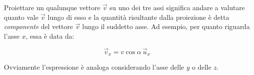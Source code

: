 Proiettare un qualunque vettore $\vec{v}$ su uno dei tre assi significa andare a valutare quanto vale $\vec{v}$ lungo di esso e la quantità risultante dalla proiezione è detta \emph{componente} del vettore $\vec{v}$ lungo il suddetto asse. Ad esempio, per quanto riguarda l'asse $x$, essa è data da:

\[
	\vec{v}_x=v\cos\alpha\, \vec{u}_x
\]

Ovviamente l'espressione è analoga considerando l'asse delle $y$ o delle $z$.

\begin{figure}[htpb]
	\centering


	\begin{tikzpicture}[x=0.75pt,y=0.75pt,yscale=-1,xscale=1]


\end{tikzpicture}
\end{figure}
